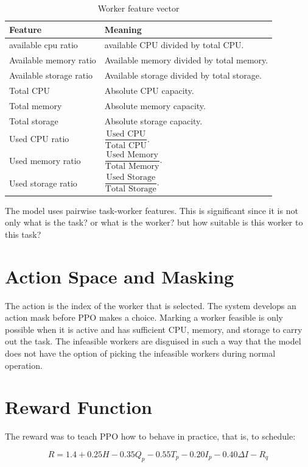 \begin{table}[H]
\centering
\caption{Worker feature vector}
\label{tab:worker_features}
\begin{tabularx}{\textwidth}{lX}
\toprule
\textbf{Feature} & \textbf{Meaning} \\
\midrule
available cpu ratio & available CPU divided by total CPU. \\
Available memory ratio & Available memory divided by total memory. \\
Available storage ratio & Available storage divided by total storage. \\
Total CPU & Absolute CPU capacity. \\
Total memory & Absolute memory capacity. \\
Total storage & Absolute storage capacity. \\
Used CPU ratio & $\dfrac{\text{Used CPU}}{\text{Total CPU}}$. \\
Used memory ratio & $\dfrac{\text{Used Memory}}{\text{Total Memory}}$. \\
Used storage ratio & $\dfrac{\text{Used Storage}}{\text{Total Storage}}$. \\
\bottomrule
\end{tabularx}
\end{table}

The model uses pairwise task-worker features. This is significant since it is not only what is the task? or what is the worker? but how suitable is this worker to this task?

\section{Action Space and Masking}

The action is the index of the worker that is selected. The system develops an action mask before PPO makes a choice. Marking a worker feasible is only possible when it is active and has sufficient CPU, memory, and storage to carry out the task. The infeasible workers are disguised in such a way that the model does not have the option of picking the infeasible workers during normal operation.

\section{Reward Function}

The reward was to teach PPO how to behave in practice, that is, to schedule:

\[
R = 1.4 + 0.25H - 0.35Q_p - 0.55T_p - 0.20I_p - 0.40\Delta I - R_q
\]

